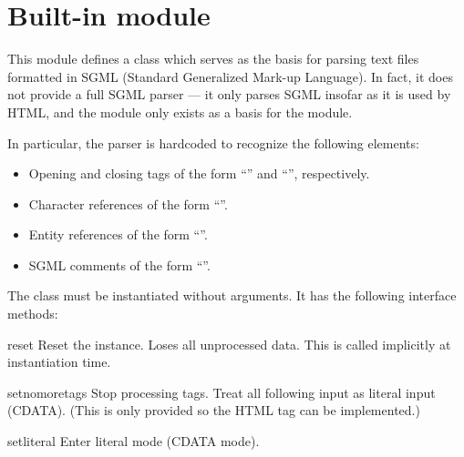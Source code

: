 \section{Built-in module }

\renewcommand{\indexsubitem}{(in module sgmllib)}

This module defines a class  which serves as the
basis for parsing text files formatted in SGML (Standard Generalized
Mark-up Language).  In fact, it does not provide a full SGML parser
--- it only parses SGML insofar as it is used by HTML, and the module only
exists as a basis for the  module.

In particular, the parser is hardcoded to recognize the following
elements:

\begin{itemize}

\item
Opening and closing tags of the form
``'' and
``'', respectively.

\item
Character references of the form ``''.

\item
Entity references of the form ``''.

\item
SGML comments of the form ``''.

\end{itemize}

The  class must be instantiated without arguments.
It has the following interface methods:

\begin{funcdesc}{reset}{}
Reset the instance.  Loses all unprocessed data.  This is called
implicitly at instantiation time.
\end{funcdesc}

\begin{funcdesc}{setnomoretags}{}
Stop processing tags.  Treat all following input as literal input
(CDATA).  (This is only provided so the HTML tag 
can be implemented.)
\end{funcdesc}

\begin{funcdesc}{setliteral}{}
Enter literal mode (CDATA mode).
\end{funcdesc}


